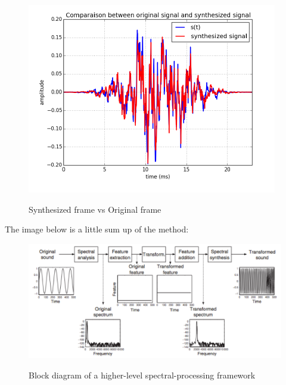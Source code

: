 \documentclass[]{article}
\begin{document}
\begin{figure}[H]
	\centering
	{\includegraphics[scale=0.7]{synthesisstep.png}}
	\caption{ Synthesized frame vs Original frame}
\end{figure}

The image below is a little sum up of the method:

\begin{figure}[H]
	\begin{center}
	{\includegraphics[scale = 0.8]{schema.png}}
	\caption{ Block diagram of a higher-level spectral-processing framework}
	\end{center}
\end{figure}

\newpage
\end{document}
